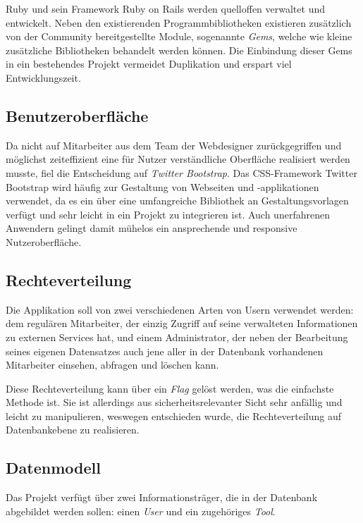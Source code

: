 Ruby und sein Framework Ruby on Rails werden quelloffen verwaltet und entwickelt. Neben den
existierenden Programmbibliotheken existieren zusätzlich von der Community bereitgestellte Module,
sogenannte \textit{Gems}, welche wie kleine zusätzliche Bibliotheken behandelt werden können. Die
Einbindung dieser Gems in ein bestehendes Projekt vermeidet Duplikation und erspart viel
Entwicklungszeit.

\subsection{Benutzeroberfläche}
\label{sec:Benutzeroberfläche}
Da nicht auf Mitarbeiter aus dem Team der Webdesigner zurückgegriffen und möglichst zeiteffizient
eine für Nutzer verständliche Oberfläche realisiert werden musste, fiel die Entscheidung auf
\textit{Twitter Bootstrap}.
Das CSS-Framework Twitter Bootstrap wird häufig zur Gestaltung von Webseiten und
-applikationen verwendet, da es ein über eine umfangreiche Bibliothek an Gestaltungsvorlagen
verfügt und sehr leicht in ein Projekt zu integrieren ist. Auch unerfahrenen Anwendern gelingt damit
mühelos ein ansprechende und responsive Nutzeroberfläche.

\subsection{Rechteverteilung}
\label{sec:Rechteverteilung}
Die Applikation soll von zwei verschiedenen Arten von Usern verwendet werden: dem regulären
Mitarbeiter, der einzig Zugriff auf seine verwalteten Informationen zu externen Services hat, und
einem Administrator, der neben der Bearbeitung seines eigenen Datensatzes auch jene aller in der
Datenbank vorhandenen Mitarbeiter einsehen, abfragen und löschen kann.

Diese Rechteverteilung kann über ein \textit{Flag} gelöst werden, was die einfachste Methode ist.
Sie ist allerdings aus sicherheitsrelevanter Sicht sehr anfällig und leicht zu manipulieren,
weswegen entschieden wurde, die Rechteverteilung auf Datenbankebene zu realisieren.

\subsection{Datenmodell}
\label{sec:Datenmodell}
Das Projekt verfügt über zwei Informationsträger, die in der Datenbank abgebildet werden
sollen: einen \textit{User} und ein zugehöriges \textit{Tool}.


